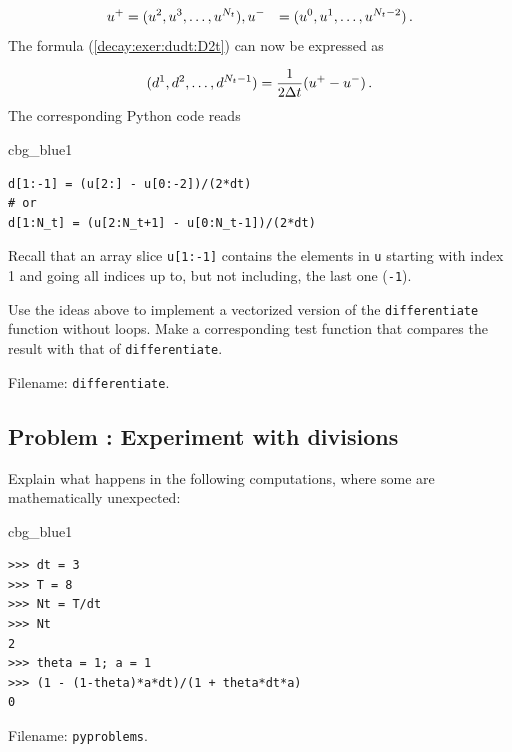 \documentclass[%
oneside,                 %
final,                   %
10pt]{article}
\newenvironment{_cod_tight}[1]{
   \def\FrameCommand{\colorbox{#1}}
   \FrameRule0.6pt\MakeFramed {\FrameRestore}\vskip3mm}
   {\vskip0mm\endMakeFramed}
\newenvironment{cod}[1]{
\bgroup\rmfamily
\fboxsep=0mm\relax
\begin{_cod_tight}{#1}
\list{}{\parsep=-2mm\parskip=0mm\topsep=0pt\leftmargin=2mm
\rightmargin=2\leftmargin\leftmargin=4pt\relax}
\item\relax}
{\endlist\end{_cod_tight}\egroup}
\newenvironment{doconceexercise}{}{}
\newcounter{doconceexercisecounter}
\begin{document}
\begin{doconceexercise}
\begin{align*}
u^+ &= (u^2,u^3,\ldots,u^{N_t}),
u^- &= (u^0,u^1,\ldots,u^{N_t-2})\thinspace .
\end{align*}
The formula (\ref{decay:exer:dudt:D2t}) can now be expressed as

\[ (d^1,d^2,\ldots,d^{N_t-1}) = \frac{1}{2\Delta t}(u^+ - u^-)\thinspace .\]
The corresponding Python code reads

\begin{cod}{cbg_blue1}\begin{Verbatim}[numbers=none,fontsize=\fontsize{9pt}{9pt},baselinestretch=0.95,xleftmargin=2mm]
d[1:-1] = (u[2:] - u[0:-2])/(2*dt)
# or
d[1:N_t] = (u[2:N_t+1] - u[0:N_t-1])/(2*dt)
\end{Verbatim}
\end{cod}
\noindent
Recall that an array slice \texttt{u[1:-1]} contains the elements in \texttt{u} starting
with index 1 and going all indices up to, but not including, the last one
(\texttt{-1}).

Use the ideas above to implement a vectorized version of the
\texttt{differentiate} function without loops. Make a corresponding
test function that compares the result with that of
\texttt{differentiate}.



\noindent Filename: \texttt{differentiate}.

\end{doconceexercise}




\begin{doconceexercise}

\subsection*{Problem \thedoconceexercisecounter: Experiment with divisions}

\label{decay:exer:intdiv}

Explain what happens in the following computations, where
some are mathematically unexpected:

\begin{cod}{cbg_blue1}\begin{Verbatim}[numbers=none,fontsize=\fontsize{9pt}{9pt},baselinestretch=0.95,xleftmargin=2mm]
>>> dt = 3
>>> T = 8
>>> Nt = T/dt
>>> Nt
2
>>> theta = 1; a = 1
>>> (1 - (1-theta)*a*dt)/(1 + theta*dt*a)
0
\end{Verbatim}
\end{cod}
\noindent


\noindent Filename: \texttt{pyproblems}.

\end{doconceexercise}
\end{document}
